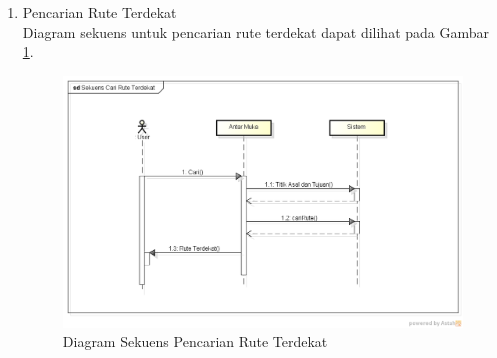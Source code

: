 \begin{enumerate}
  \item Pencarian Rute Terdekat\\
  Diagram sekuens untuk pencarian rute terdekat dapat dilihat pada Gambar
  \ref{fig:sd_rute}.
\begin{figure}[h]
\centering
\includegraphics[scale=0.47]{Gambar/sd_rute}
\caption[Diagram Sekuens Pencarian Rute Terdekat]{Diagram Sekuens Pencarian Rute Terdekat}
\label{fig:sd_rute}
\end{figure}
\end{enumerate}